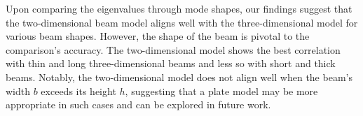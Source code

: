 Upon comparing the eigenvalues through mode shapes, our findings suggest that the two-dimensional beam model aligns well with the three-dimensional model for various beam shapes. However, the shape of the beam is pivotal to the comparison's accuracy. The two-dimensional model shows the best correlation with thin and long three-dimensional beams and less so with short and thick beams. Notably, the two-dimensional model does not align well when the beam's width $b$ exceeds its height $h$, suggesting that a plate model may be more appropriate in such cases and can be explored in future work.




